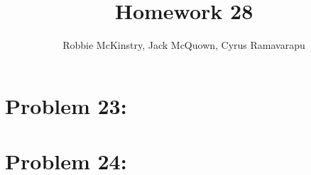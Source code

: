 \documentclass[12pt]{article}
\begin{document}
\title{Homework 28}
\author{Robbie McKinstry, Jack McQuown, Cyrus Ramavarapu}
\renewcommand{\today}{7 November 2016}
\renewcommand{\baselinestretch}{1.5}
\maketitle

\section*{Problem 23: }
\section*{Problem 24: }
\end{document}
